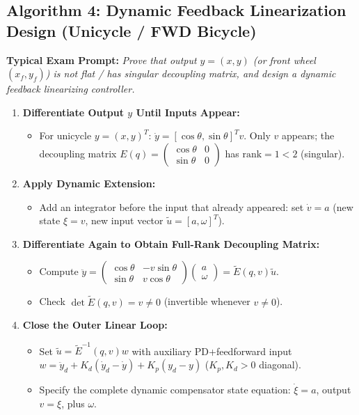 \documentclass[10pt, a4paper]{article}
\begin{document}
\subsection*{Algorithm 4: Dynamic Feedback Linearization Design (Unicycle / FWD Bicycle)}
\textbf{Typical Exam Prompt:} \textit{Prove that output $y = (x,y)$ (or front wheel $(x_f, y_f)$) is not flat / has singular decoupling matrix, and design a dynamic feedback linearizing controller.}
\begin{enumerate}
    \item \textbf{Differentiate Output $y$ Until Inputs Appear:}
    \begin{itemize}
        \item For unicycle $y = (x,y)^T$: $\dot{y} = [\cos\theta, \sin\theta]^T v$. Only $v$ appears; the decoupling matrix $E(q) = \begin{pmatrix} \cos\theta & 0 \\ \sin\theta & 0 \end{pmatrix}$ has $\text{rank} = 1 < 2$ (singular).
    \end{itemize}
    \item \textbf{Apply Dynamic Extension:}
    \begin{itemize}
        \item Add an integrator before the input that already appeared: set $\dot{v} = a$ (new state $\xi = v$, new input vector $\tilde{u} = [a, \omega]^T$).
    \end{itemize}
    \item \textbf{Differentiate Again to Obtain Full-Rank Decoupling Matrix:}
    \begin{itemize}
        \item Compute $\ddot{y} = \begin{pmatrix} \cos\theta & -v\sin\theta \\ \sin\theta & v\cos\theta \end{pmatrix} \begin{pmatrix} a \\ \omega \end{pmatrix} = \tilde{E}(q, v)\tilde{u}$.
        \item Check $\det \tilde{E}(q, v) = v \neq 0$ (invertible whenever $v \neq 0$).
    \end{itemize}
    \item \textbf{Close the Outer Linear Loop:}
    \begin{itemize}
        \item Set $\tilde{u} = \tilde{E}^{-1}(q, v)w$ with auxiliary PD+feedforward input $w = \ddot{y}_d + K_d(\dot{y}_d - \dot{y}) + K_p(y_d - y)$ ($K_p, K_d > 0$ diagonal).
        \item Specify the complete dynamic compensator state equation: $\dot{\xi} = a$, output $v = \xi$, plus $\omega$.
    \end{itemize}
\end{enumerate}
\end{document}
